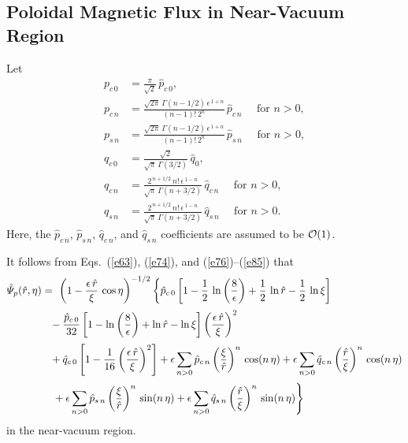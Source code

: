 \documentclass[12pt,prb,aps]{revtex4-1}
\begin{document}
\subsection{Poloidal Magnetic Flux in Near-Vacuum Region}\label{spol}
Let
\begin{align}
p_{c\,0}&= \frac{\pi}{\sqrt{2}}\,\hat{p}_{c\,0},\\[0.5ex]
p_{c\,n} &=\frac{\sqrt{2\pi}\,\Gamma(n-1/2)\,\epsilon^{\,1+n}}{(n-1)!\,2^n}\,\hat{p}_{c\,n}~~~~~~\mbox{for $n>0$},\\[0.5ex]
p_{s\,n} &=\frac{\sqrt{2\pi}\,\Gamma(n-1/2)\,\epsilon^{\,1+n}}{(n-1)!\,2^n}\,\hat{p}_{s\,n}~~~~~~\mbox{for $n>0$},\\[0.5ex]
q_{c\,0} &= \frac{\sqrt{2}}{\sqrt{\pi}\,\Gamma(3/2)}\,\hat{q}_0,\label{e84v}\\[0.5ex]
q_{c\,n} &= \frac{2^{\,n+1/2}\,n!\,\epsilon^{\,1-n}}{\sqrt{\pi}\,\Gamma(n+3/2)}\,\hat{q}_{c\,n}~~~~~~\mbox{for $n>0$},\\[0.5ex]
q_{s\,n} &= \frac{2^{\,n+1/2}\,n!\,\epsilon^{\,1-n}}{\sqrt{\pi}\,\Gamma(n+3/2)}\,\hat{q}_{s\,n}~~~~~~\mbox{for $n>0$}.\label{e85}
\end{align}
Here, the $\hat{p}_{c\,n}$, $\hat{p}_{s\,n}$, $\hat{q}_{c\,n}$, and $\hat{q}_{s\,n}$ coefficients are assumed to be ${\cal O}(1)$. 

It follows from Eqs.~(\ref{e63}), (\ref{e74}), and  (\ref{e76})--(\ref{e85}) that 
\begin{align}
\hat{\mit\Psi}_p(\hat{r},\eta)&=\ \left(1-\frac{\epsilon\,\hat{r}}{\xi}\,\cos\eta\right)^{-1/2}
\left\{\hat{p}_{c\,0}\left[1-\frac{1}{2}\,\ln\left(\frac{8}{\epsilon}\right)+\frac{1}{2}\,\ln\hat{r}-\frac{1}{2}\,\ln\xi\right]\right.\nonumber\\[0.5ex]
&\phantom{=}-\frac{\hat{p}_{c\,0}}{32}\left[1-\ln\left(\frac{8}{\epsilon}\right)+\ln\hat{r}-\ln\xi\right]\left(\frac{\epsilon\,\hat{r}}{\xi}\right)^2\nonumber\\[0.5ex]
&\phantom{=} +\hat{q}_{c\,0}\left[1- \frac{1}{16}\left(\frac{\epsilon\,\hat{r}}{\xi}\right)^2\right]
+ \epsilon\sum_{n>0}\hat{p}_{c\,n}\left(\frac{\xi}{\hat{r}}\right)^n\,\cos(n\,\eta)+ \epsilon\sum_{n>0}\hat{q}_{c\,n}\left(\frac{\hat{r}}{\xi}\right)^n\,\cos(n\,\eta)
\nonumber\\[0.5ex]&\left.\phantom{=} + \epsilon\sum_{n>0}\hat{p}_{s\,n}\left(\frac{\xi}{\hat{r}}\right)^n\,\sin(n\,\eta)+ \epsilon\sum_{n>0}\hat{q}_{s\,n}\left(\frac{\hat{r}}{\xi}\right)^n\,\sin(n\,\eta)\right\}
\end{align}
in the near-vacuum region. 
\end{document}
